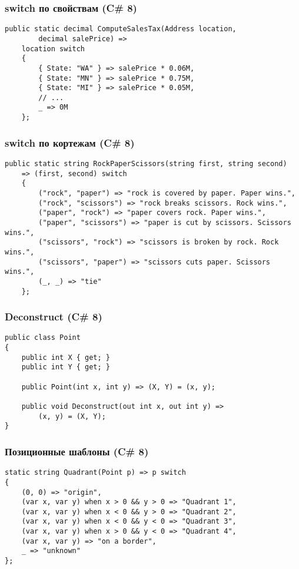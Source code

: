 \documentclass[xetex,mathserif,serif]{beamer}
\begin{document}
    \begin{frame}[fragile]
        \frametitle{switch по свойствам (C\# 8)}
        \begin{verbatim}
public static decimal ComputeSalesTax(Address location, 
        decimal salePrice) =>
    location switch
    {
        { State: "WA" } => salePrice * 0.06M,
        { State: "MN" } => salePrice * 0.75M,
        { State: "MI" } => salePrice * 0.05M,
        // ...
        _ => 0M
    };
        \end{verbatim}
    \end{frame}

    \begin{frame}[fragile]
        \frametitle{switch по кортежам (C\# 8)}
        \begin{verbatim}
public static string RockPaperScissors(string first, string second)
    => (first, second) switch
    {
        ("rock", "paper") => "rock is covered by paper. Paper wins.",
        ("rock", "scissors") => "rock breaks scissors. Rock wins.",
        ("paper", "rock") => "paper covers rock. Paper wins.",
        ("paper", "scissors") => "paper is cut by scissors. Scissors wins.",
        ("scissors", "rock") => "scissors is broken by rock. Rock wins.",
        ("scissors", "paper") => "scissors cuts paper. Scissors wins.",
        (_, _) => "tie"
    };
        \end{verbatim}
    \end{frame}

    \begin{frame}[fragile]
        \frametitle{Deconstruct (C\# 8)}
        \begin{verbatim}
public class Point
{
    public int X { get; }
    public int Y { get; }

    public Point(int x, int y) => (X, Y) = (x, y);

    public void Deconstruct(out int x, out int y) =>
        (x, y) = (X, Y);
}
        \end{verbatim}
    \end{frame}

    \begin{frame}[fragile]
        \frametitle{Позиционные шаблоны (C\# 8)}
        \begin{verbatim}
static string Quadrant(Point p) => p switch
{
    (0, 0) => "origin",
    (var x, var y) when x > 0 && y > 0 => "Quadrant 1",
    (var x, var y) when x < 0 && y > 0 => "Quadrant 2",
    (var x, var y) when x < 0 && y < 0 => "Quadrant 3",
    (var x, var y) when x > 0 && y < 0 => "Quadrant 4",
    (var x, var y) => "on a border",
    _ => "unknown"
};
        \end{verbatim}
    \end{frame}
\end{document}

